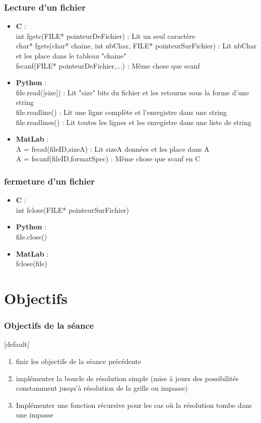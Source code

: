 \documentclass{beamer}
\begin{document}
	\begin{frame}
		\frametitle{Lecture d'un fichier}
		\begin{itemize}
			\item {\bfseries C} : \\
			int fgetc(FILE* pointeurDeFichier) : Lit un seul caractère \\
			char* fgets(char* chaine, int nbChar, FILE* pointeurSurFichier) : Lit nbChar et les place dans le tableau "chaine" \\
			fscanf(FILE* pointeurDeFichier,...) : Même chose que scanf 
			\item {\bfseries Python} : \\
			file.read([size]) : Lit "size" bits du fichier et les retourne sous la forme d'une string\\
			file.readline() : Lit une ligne complète et l'enregistre dans une string\\
			file.readlines() : Lit toutes les lignes et les enregistre dans une liste de string\\
			\item {\bfseries MatLab} : \\
			A = fread(fileID,sizeA) : Lit sizeA données et les place dans A \\
			A = fscanf(fileID,formatSpec) : Même chose que scanf en C
		\end{itemize}
	\end{frame}

	\begin{frame}%
	\frametitle{fermeture d'un fichier}
	\begin{itemize}
		\item  {\bfseries C} : \\
		int fclose(FILE* pointeurSurFichier)
		\item  {\bfseries Python} : \\
		file.close()
		\item  {\bfseries MatLab} : \\
		fclose(file)
	\end{itemize}
	\end{frame}

	\section{Objectifs}
	\begin{frame}
	\frametitle{Objectifs de la séance}
	[default]
	\begin{enumerate}
		\item finir les objectifs de la séance précédente
		\item implémenter la boucle de résolution simple (mise à jours des possibilités constamment jusqu'à résolution de la grille ou impasse)
		\item Implémenter une fonction récursive pour les cas où la résolution tombe dans une impasse
	\end{enumerate}
\end{frame}
\end{document}
